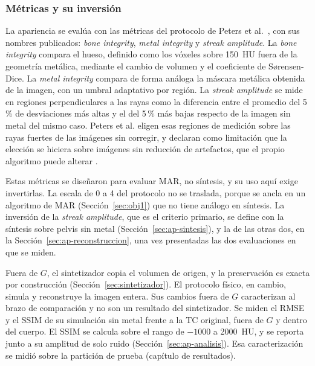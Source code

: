 \subsubsection{Métricas y su inversión}\label{sec:ap-metricas}

La apariencia se evalúa con las métricas del protocolo de Peters et al.~\cite{peters2025hybrid}, con sus nombres publicados: \emph{bone integrity}, \emph{metal integrity} y \emph{streak amplitude}. La \emph{bone integrity} compara el hueso, definido como los vóxeles sobre 150~HU fuera de la geometría metálica, mediante el cambio de volumen y el coeficiente de Sørensen-Dice. La \emph{metal integrity} compara de forma análoga la máscara metálica obtenida de la imagen, con un umbral adaptativo por región. La \emph{streak amplitude} se mide en regiones perpendiculares a las rayas como la diferencia entre el promedio del 5\,\% de desviaciones más altas y el del 5\,\% más bajas respecto de la imagen sin metal del mismo caso. Peters et al. eligen esas regiones de medición sobre las rayas fuertes de las imágenes sin corregir, y declaran como limitación que la elección se hiciera sobre imágenes sin reducción de artefactos, que el propio algoritmo puede alterar \cite{peters2025hybrid}.

Estas métricas se diseñaron para evaluar MAR, no síntesis, y su uso aquí exige invertirlas. La escala de 0 a 4 del protocolo no se traslada, porque se ancla en un algoritmo de MAR (Sección~\ref{sec:obj1}) que no tiene análogo en síntesis. La inversión de la \emph{streak amplitude}, que es el criterio primario, se define con la síntesis sobre pelvis sin metal (Sección~\ref{sec:ap-sintesis}), y la de las otras dos, en la Sección~\ref{sec:ap-reconstruccion}, una vez presentadas las dos evaluaciones en que se miden.

Fuera de $G$, el sintetizador copia el volumen de origen, y la preservación es exacta por construcción (Sección~\ref{sec:sintetizador}). El protocolo físico, en cambio, simula y reconstruye la imagen entera. Sus cambios fuera de $G$ caracterizan al brazo de comparación y no son un resultado del sintetizador. Se miden el RMSE y el SSIM de su simulación sin metal frente a la TC original, fuera de $G$ y dentro del cuerpo. El SSIM se calcula sobre el rango de $-1000$ a 2000~HU, y se reporta junto a su amplitud de solo ruido (Sección~\ref{sec:ap-analisis}). Esa caracterización se midió sobre la partición de prueba (capítulo de resultados).


